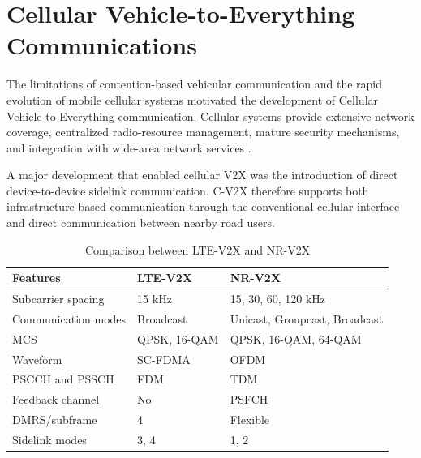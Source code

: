 \section{Cellular Vehicle-to-Everything Communications}
\label{sec:cv2x}

The limitations of contention-based vehicular communication and the rapid
evolution of mobile cellular systems motivated the development of Cellular
Vehicle-to-Everything communication. Cellular systems provide extensive
network coverage, centralized radio-resource management, mature security
mechanisms, and integration with wide-area network services
\cite{araniti2013lte,gyawali2021challenges}.

A major development that enabled cellular V2X was the introduction of direct
device-to-device sidelink communication. C-V2X therefore supports both
infrastructure-based communication through the conventional cellular
interface and direct communication between nearby road users.


\begin{table}[!ht]
\centering
\caption{Comparison between LTE-V2X and NR-V2X}
\label{tab:lte_nr_v2x_comparison}
\renewcommand{\arraystretch}{1.15}
\begin{tabular}{p{} p{} p{}}
\hline\hline
\textbf{Features} & \textbf{LTE-V2X} & \textbf{NR-V2X} \\
\hline

Subcarrier spacing
& 15 kHz
& 15, 30, 60, 120 kHz \\

Communication modes
& Broadcast
& Unicast, Groupcast, Broadcast \\

MCS
& QPSK, 16-QAM
& QPSK, 16-QAM, 64-QAM \\

Waveform
& SC-FDMA
& OFDM \\

PSCCH and PSSCH
& FDM
& TDM \\

Feedback channel
& No
& PSFCH \\

DMRS/subframe
& 4
& Flexible \\

Sidelink modes
& 3, 4
& 1, 2 \\

\hline\hline
\end{tabular}
\end{table}



